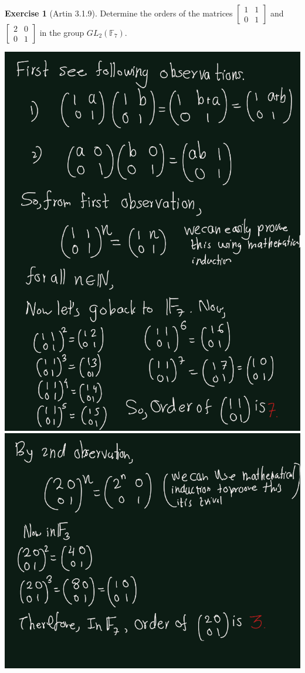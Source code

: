 \documentclass[
]{book}
\theoremstyle{definition}
\theoremstyle{definition}
\theoremstyle{definition}
\newtheorem{exercise}{Exercise}[chapter]
\theoremstyle{definition}
\theoremstyle{remark}
\begin{document}
\begin{exercise}[Artin 3.1.9]
\protect\hypertarget{exr:unnamed-chunk-268}{}\label{exr:unnamed-chunk-268}Determine the orders of the matrices
\(\begin{bmatrix} 1 & 1 \\ 0 & 1 \end{bmatrix}\)
and
\(\begin{bmatrix} 2 & 0 \\ 0 & 1 \end{bmatrix}\)
in the group \(GL_2(\mathbb{F}_7)\).
\end{exercise}

\includegraphics{figures/ch_3/ex-1.9-1.png}
\includegraphics{figures/ch_3/ex-1.9-2.png}
\end{document}
